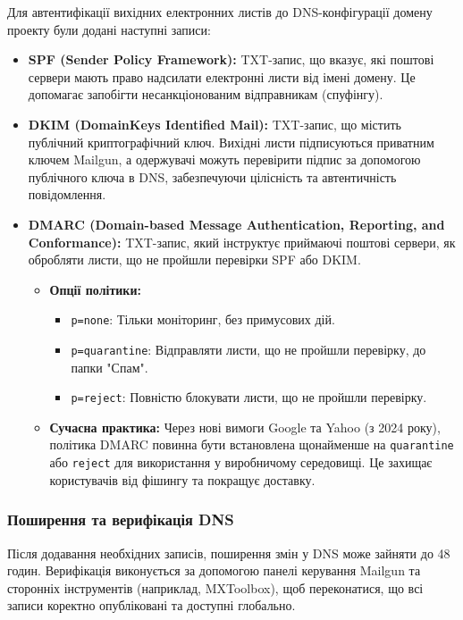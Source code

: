 Для автентифікації вихідних електронних листів до DNS-конфігурації домену проекту були додані наступні записи:

\begin{itemize}
    \item \textbf{SPF (Sender Policy Framework):} TXT-запис, що вказує, які поштові сервери мають право надсилати електронні листи від імені домену. Це допомагає запобігти несанкціонованим відправникам (спуфінгу).
    \item \textbf{DKIM (DomainKeys Identified Mail):} TXT-запис, що містить публічний криптографічний ключ. Вихідні листи підписуються приватним ключем Mailgun, а одержувачі можуть перевірити підпис за допомогою публічного ключа в DNS, забезпечуючи цілісність та автентичність повідомлення.
    \item \textbf{DMARC (Domain-based Message Authentication, Reporting, and Conformance):} TXT-запис, який інструктує приймаючі поштові сервери, як обробляти листи, що не пройшли перевірки SPF або DKIM.
        \begin{itemize}
            \item \textbf{Опції політики:}
                \begin{itemize}
                    \item \texttt{p=none}: Тільки моніторинг, без примусових дій.
                    \item \texttt{p=quarantine}: Відправляти листи, що не пройшли перевірку, до папки "Спам".
                    \item \texttt{p=reject}: Повністю блокувати листи, що не пройшли перевірку.
                \end{itemize}
            \item \textbf{Сучасна практика:} Через нові вимоги Google та Yahoo (з 2024 року), політика DMARC повинна бути встановлена щонайменше на \texttt{quarantine} або \texttt{reject} для використання у виробничому середовищі. Це захищає користувачів від фішингу та покращує доставку.
        \end{itemize}
\end{itemize}

\subsubsection{Поширення та верифікація DNS}

Після додавання необхідних записів, поширення змін у DNS може зайняти до 48 годин. Верифікація виконується за допомогою панелі керування Mailgun та сторонніх інструментів (наприклад, MXToolbox), щоб переконатися, що всі записи коректно опубліковані та доступні глобально.

